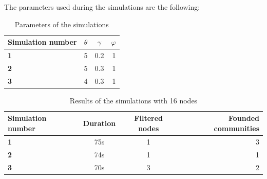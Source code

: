 \documentclass[12pt]{article}
\begin{document}
The parameters used during the simulations are the following:
\begin{table}[tbhp]
    \centering
    \begin{tabu}{|l|c|c|r|}
        \hline
        Simulation number & $\theta$ & $\gamma$  & $\varphi$  \\ \hline
        \textbf{1}    & 5  & 0.2  & 1   \\ \hline
        \textbf{2}    & 5  & 0.3  & 1   \\ \hline
        \textbf{3}    & 4  & 0.3  & 1   \\ \hline


  \end{tabu}                                                                                        \label{tab:parameters1}
    \caption[A Table]{Parameters of the simulations}
\end{table}
\newpage
\begin{table}[H]
    \centering
    \begin{tabu}{|l|c|c|r|}
        \hline
        Simulation number & Duration & Filtered nodes  & Founded communities  \\ \hline
        \textbf{1}    & 75s  & 1  & 3   \\ \hline
        \textbf{2}    & 74s  & 1  & 1   \\ \hline
        \textbf{3}    & 70s  & 3  & 2   \\ \hline  \end{tabu}
    \caption{Results of the simulations with 16 nodes}
    \label{tab:result1}
\end{table}
\end{document}
